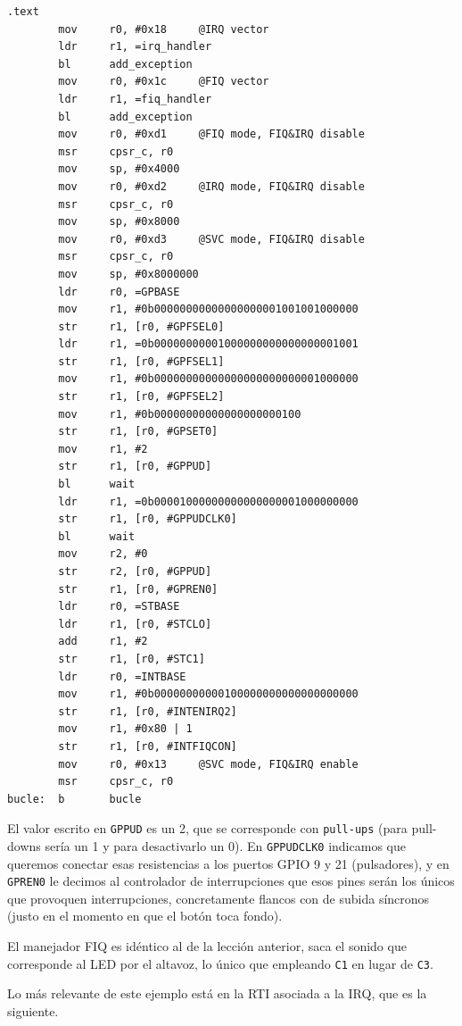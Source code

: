 \begin{lstlisting}[caption={Programa principal de inter4.c},label={lst:codigoPract5_1}]
.text
        mov     r0, #0x18     @IRQ vector
        ldr     r1, =irq_handler
        bl      add_exception
        mov     r0, #0x1c     @FIQ vector
        ldr     r1, =fiq_handler
        bl      add_exception
        mov     r0, #0xd1     @FIQ mode, FIQ&IRQ disable
        msr     cpsr_c, r0
        mov     sp, #0x4000
        mov     r0, #0xd2     @IRQ mode, FIQ&IRQ disable
        msr     cpsr_c, r0
        mov     sp, #0x8000
        mov     r0, #0xd3     @SVC mode, FIQ&IRQ disable
        msr     cpsr_c, r0
        mov     sp, #0x8000000
        ldr     r0, =GPBASE
        mov     r1, #0b00000000000000000001001001000000
        str     r1, [r0, #GPFSEL0]
        ldr     r1, =0b00000000001000000000000000001001
        str     r1, [r0, #GPFSEL1]
        mov     r1, #0b00000000000000000000000001000000
        str     r1, [r0, #GPFSEL2]
        mov     r1, #0b00000000000000000000100
        str     r1, [r0, #GPSET0]
        mov     r1, #2
        str     r1, [r0, #GPPUD]
        bl      wait
        ldr     r1, =0b00001000000000000000001000000000
        str     r1, [r0, #GPPUDCLK0]
        bl      wait
        mov     r2, #0
        str     r2, [r0, #GPPUD]
        str     r1, [r0, #GPREN0]
        ldr     r0, =STBASE
        ldr     r1, [r0, #STCLO]
        add     r1, #2
        str     r1, [r0, #STC1]
        ldr     r0, =INTBASE
        mov     r1, #0b00000000000100000000000000000000
        str     r1, [r0, #INTENIRQ2]
        mov     r1, #0x80 | 1
        str     r1, [r0, #INTFIQCON]
        mov     r0, #0x13     @SVC mode, FIQ&IRQ enable
        msr     cpsr_c, r0
bucle:  b       bucle
\end{lstlisting}

El valor escrito en {\tt GPPUD} es un 2, que se corresponde con {\tt pull-ups} (para pull-downs
sería un 1 y para desactivarlo un 0). En {\tt GPPUDCLK0} indicamos que queremos conectar esas
resistencias a los puertos GPIO 9 y 21 (pulsadores), y en {\tt GPREN0} le decimos al controlador
de interrupciones que esos pines serán los únicos que provoquen interrupciones, concretamente
flancos con de subida síncronos (justo en el momento en que el botón toca fondo).

El manejador FIQ es idéntico al de la lección anterior, saca el sonido que corresponde al LED
por el altavoz, lo único que empleando {\tt C1} en lugar de {\tt C3}.

Lo más relevante de este ejemplo está en la RTI asociada a la IRQ, que es la siguiente.

